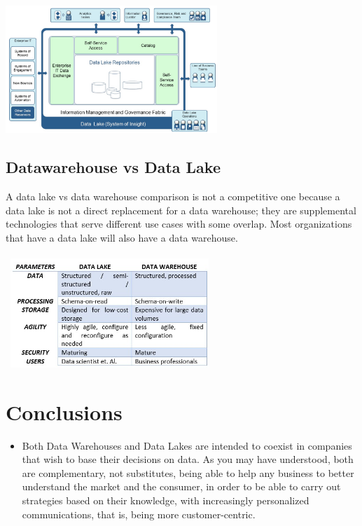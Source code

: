 \documentclass{article}
\begin{document}
\begin{multicols}{2}
\begin{itemize}
\begin{center}
	\includegraphics[width=8cm]{./images/IBM.png} 
\end{center}
\end{itemize}

 



\subsection{Datawarehouse vs Data Lake}
A data lake vs data warehouse comparison is not a competitive one because a data lake is not a direct replacement for a data warehouse; they are supplemental technologies that serve different use cases with some overlap. Most organizations that have a data lake will also have a data warehouse.
\\\
\\\
\includegraphics[width=7.5cm]{images/vs.jpg}





\section{Conclusions}
\begin{itemize}
    \item Both Data Warehouses and Data Lakes are intended to coexist in companies that wish to base their decisions on data. As you may have understood, both are complementary, not substitutes, being able to help any business to better understand the market and the consumer, in order to be able to carry out strategies based on their knowledge, with increasingly personalized communications, that is, being more customer-centric.
    

\end{itemize}
\end{multicols}
\end{document}

